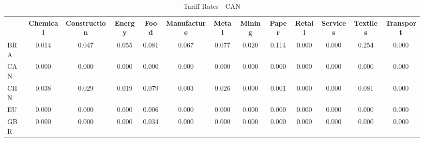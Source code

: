 \begin{table}[htbp]
\centering
\caption{Tariff Rates - CAN} 
\label{tab:tariff_CAN}
\begin{tabular}{lcccccccccccc}
  \hline
 & Chemical & Construction & Energy & Food & Manufacture & Metal & Mining & Paper & Retail & Services & Textiles & Transport \\ 
  \hline
BRA & \textcolor[RGB]{66,43,189}{0.014} & \textcolor[RGB]{34,22,221}{0.047} & \textcolor[RGB]{32,21,223}{0.055} & \textcolor[RGB]{15,10,240}{0.081} & \textcolor[RGB]{30,19,225}{0.067} & \textcolor[RGB]{23,15,232}{0.077} & \textcolor[RGB]{55,36,200}{0.020} & \textcolor[RGB]{6,4,249}{0.114} & \textcolor[RGB]{255,165,0}{0.000} & \textcolor[RGB]{255,165,0}{0.000} & \textcolor[RGB]{0,0,255}{0.254} & \textcolor[RGB]{255,165,0}{0.000} \\ 
  CAN & \textcolor[RGB]{255,165,0}{0.000} & \textcolor[RGB]{255,165,0}{0.000} & \textcolor[RGB]{255,165,0}{0.000} & \textcolor[RGB]{255,165,0}{0.000} & \textcolor[RGB]{255,165,0}{0.000} & \textcolor[RGB]{255,165,0}{0.000} & \textcolor[RGB]{255,165,0}{0.000} & \textcolor[RGB]{255,165,0}{0.000} & \textcolor[RGB]{255,165,0}{0.000} & \textcolor[RGB]{255,165,0}{0.000} & \textcolor[RGB]{255,165,0}{0.000} & \textcolor[RGB]{255,165,0}{0.000} \\ 
  CHN & \textcolor[RGB]{40,26,215}{0.038} & \textcolor[RGB]{49,32,206}{0.029} & \textcolor[RGB]{57,37,198}{0.019} & \textcolor[RGB]{21,14,234}{0.079} & \textcolor[RGB]{91,59,164}{0.003} & \textcolor[RGB]{51,33,204}{0.026} & \textcolor[RGB]{255,165,0}{0.000} & \textcolor[RGB]{100,65,155}{0.001} & \textcolor[RGB]{255,165,0}{0.000} & \textcolor[RGB]{255,165,0}{0.000} & \textcolor[RGB]{17,11,238}{0.081} & \textcolor[RGB]{255,165,0}{0.000} \\ 
  EU & \textcolor[RGB]{255,165,0}{0.000} & \textcolor[RGB]{255,165,0}{0.000} & \textcolor[RGB]{255,165,0}{0.000} & \textcolor[RGB]{87,56,168}{0.006} & \textcolor[RGB]{108,70,147}{0.000} & \textcolor[RGB]{255,165,0}{0.000} & \textcolor[RGB]{255,165,0}{0.000} & \textcolor[RGB]{255,165,0}{0.000} & \textcolor[RGB]{255,165,0}{0.000} & \textcolor[RGB]{255,165,0}{0.000} & \textcolor[RGB]{255,165,0}{0.000} & \textcolor[RGB]{255,165,0}{0.000} \\ 
  GBR & \textcolor[RGB]{255,165,0}{0.000} & \textcolor[RGB]{255,165,0}{0.000} & \textcolor[RGB]{255,165,0}{0.000} & \textcolor[RGB]{45,29,210}{0.034} & \textcolor[RGB]{255,165,0}{0.000} & \textcolor[RGB]{255,165,0}{0.000} & \textcolor[RGB]{255,165,0}{0.000} & \textcolor[RGB]{255,165,0}{0.000} & \textcolor[RGB]{255,165,0}{0.000} & \textcolor[RGB]{255,165,0}{0.000} & \textcolor[RGB]{255,165,0}{0.000} & \textcolor[RGB]{255,165,0}{0.000} \\ 

\end{tabular}
\end{table}
